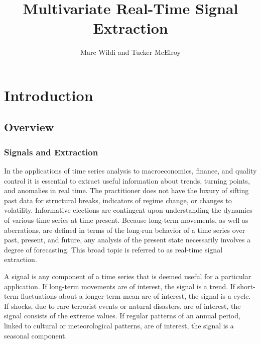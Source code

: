 \documentclass[a4paper]{book}
\title{Multivariate Real-Time Signal Extraction}
\author{Marc Wildi and Tucker McElroy}
\begin{document}
\maketitle

\date{}


\frontmatter%

%
%




\tableofcontents


\mainmatter%



\chapter{Introduction}\label{intro_sec}

\section{Overview}

\subsection{Signals and Extraction}

In the applications of time series analysis to macroeconomics, finance, and quality control
 it is essential to extract useful information about trends, turning points, and anomalies
 in real time.  The practitioner does not have the luxury of sifting past data for 
 structural breaks, indicators of regime change, or changes to volatility.  Informative elections are
 contingent upon understanding the dynamics of various time series at time present.  Because
 long-term movements, as well as aberrations, are defined in terms of the long-run behavior of a 
 time series over past, present, and future, any analysis of the present state necessarily involves
 a degree of forecasting.  This  broad topic is referred to as real-time signal extraction.

A signal is any component of a time series that is deemed useful for a particular application.  
If long-term movements are of interest, the signal is a trend.  If short-term fluctuations about
 a longer-term mean are of interest, the signal is a cycle.  If shocks, due to rare
 terrorist events or natural disasters, are of interest, the signal consists of the extreme values.
 If regular patterns of an annual period, linked to cultural or meteorological patterns, are of interest,
 the signal is a seasonal component.
\end{document}
